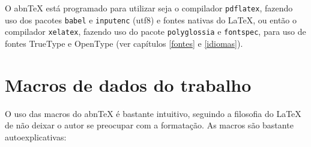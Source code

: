 %

O abn\TeX{} está programado para utilizar seja o compilador \texttt{pdflatex}, fazendo uso dos pacotes \texttt{babel} e \texttt{inputenc} (utf8) e fontes nativas do \LaTeX, ou então o compilador \texttt{xelatex}, fazendo uso do pacote \texttt{polyglossia} e \texttt{fontspec}, para uso de fontes TrueType e OpenType (ver capítulos \ref{fontes} e \ref{idiomas}).

\section{Macros de dados do trabalho}\label{sec-macrosdados}
O uso das macros do abn\TeX{} é bastante intuitivo, seguindo a filosofia do \LaTeX{} de não deixar o autor se preocupar com a formatação. As macros são bastante autoexplicativas:

